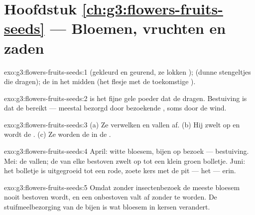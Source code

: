 \section*{Hoofdstuk \ref{ch:g3:flowers-fruits-seeds} --- Bloemen, vruchten en zaden}

\begin{solution}{exo:g3:flowers-fruits-seeds:1}
 (gekleurd en geurend, ze lokken ); 
(dunne stengeltjes die  dragen); de  in het midden (het
flesje met de toekomstige ).
\end{solution}

\begin{solution}{exo:g3:flowers-fruits-seeds:2}
 is het fijne gele poeder dat de  dragen. Bestuiving
is  dat de  bereikt --- meestal bezorgd door
bezoekende , soms door de wind.
\end{solution}

\begin{solution}{exo:g3:flowers-fruits-seeds:3}
(a) Ze verwelken en vallen af. (b) Hij zwelt op en wordt de .
(c) Ze worden de  in de .
\end{solution}

\begin{solution}{exo:g3:flowers-fruits-seeds:4}
April: witte bloesem, bijen op bezoek --- bestuiving. Mei: de
 vallen; de  van elke bestoven  zwelt op tot een
klein groen bolletje. Juni: het bolletje is uitgegroeid tot een rode,
zoete kers met de pit --- het  --- erin.
\end{solution}

\begin{solution}{exo:g3:flowers-fruits-seeds:5}
Omdat zonder insectenbezoek de meeste bloesem nooit bestoven wordt, en
een onbestoven  valt af zonder  te worden. De
stuifmeelbezorging van de bijen is wat bloesem in kersen verandert.
\end{solution}

